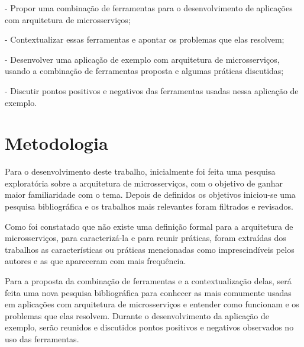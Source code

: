 
- Propor uma combinação de ferramentas para o desenvolvimento de aplicações com arquitetura de microsserviços;

- Contextualizar essas ferramentas e apontar os problemas que elas resolvem;

- Desenvolver uma aplicação de exemplo com arquitetura de microsserviços, usando a combinação de ferramentas proposta e algumas práticas discutidas;

- Discutir pontos positivos e negativos das ferramentas usadas nessa aplicação de exemplo.

\section{Metodologia}

Para o desenvolvimento deste trabalho, inicialmente foi feita uma pesquisa exploratória sobre a arquitetura de microsserviços, com o objetivo de ganhar maior familiaridade com o tema. Depois de definidos os objetivos iniciou-se uma pesquisa bibliográfica e os trabalhos mais relevantes foram filtrados e revisados. 

Como foi constatado que não existe uma definição formal para a arquitetura de microsserviços, para caracterizá-la e para reunir práticas, foram extraídas dos trabalhos as características ou práticas mencionadas como imprescindíveis pelos autores e as que apareceram com mais frequência. 

Para a proposta da combinação de ferramentas e a contextualização delas, será feita uma nova pesquisa bibliográfica para conhecer as mais comumente usadas em aplicações com arquitetura de microsserviços e entender como funcionam e os problemas que elas resolvem. Durante o desenvolvimento da aplicação de exemplo, serão reunidos e discutidos pontos positivos e negativos observados no uso das ferramentas.  


